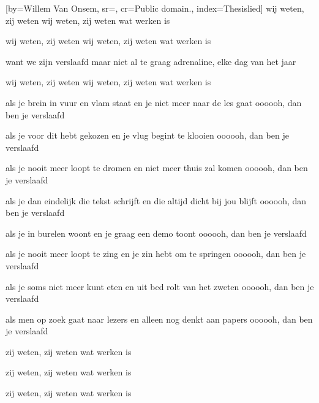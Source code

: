 [by={Willem Van Onsem},
sr={},
cr={Public domain.},
index={Thesislied}]
\beginchorus
wij weten, zij weten
wij weten, zij weten
wat werken is

wij weten, zij weten
wij weten, zij weten
wat werken is

want we zijn verslaafd
maar niet al te graag
adrenaline, elke dag van het jaar

wij weten, zij weten
wij weten, zij weten
wat werken is
\endchorus

\beginverse
als je brein in vuur en vlam staat
en je niet meer naar de les gaat
oooooh, dan ben je verslaafd

als je voor dit hebt gekozen
en je vlug begint te klooien
oooooh, dan ben je verslaafd

als je nooit meer loopt te dromen
en niet meer thuis zal komen
oooooh, dan ben je verslaafd

als je dan eindelijk die tekst schrijft
en die altijd dicht bij jou blijft
oooooh, dan ben je verslaafd
\endverse

\beginverse
als je in burelen woont
en je graag een demo toont
oooooh, dan ben je verslaafd

als je nooit meer loopt te zing
en je zin hebt om te springen
oooooh, dan ben je verslaafd

als je soms niet meer kunt eten
en uit bed rolt van het zweten
oooooh, dan ben je verslaafd

als men op zoek gaat naar lezers
en alleen nog denkt aan papers
oooooh, dan ben je verslaafd
\endverse

\beginverse
zij weten, zij weten
wat werken is

zij weten, zij weten
wat werken is

zij weten, zij weten
wat werken is
\endverse

\endsong